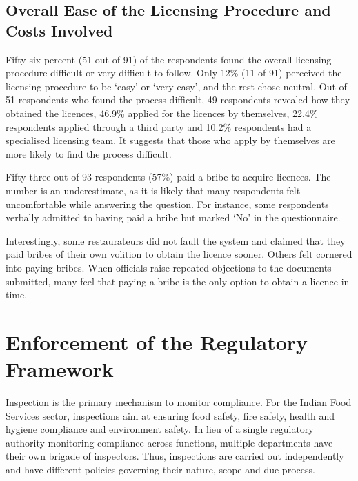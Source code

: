 \documentclass[a4paper, 12pt]{article}
\begin{document}
		
		
		\subsection{Overall Ease of the Licensing Procedure and Costs Involved}
		Fifty-six percent (51 out of 91) of the respondents found the overall licensing procedure difficult or very difficult to follow. Only 12\% (11 of 91) perceived the licensing procedure to be ‘easy’ or ‘very easy’, and the rest chose neutral. Out of 51 respondents who found the process difficult, 49 respondents revealed how they obtained the licences, 46.9\% applied for the licences by themselves, 22.4\% respondents applied through a third party and 10.2\% respondents had a specialised licensing team. It suggests that those who apply by themselves are more likely to find the process difficult.
		
		Fifty-three out of 93 respondents (57\%) paid a bribe to acquire licences. The number is an underestimate, as it is likely that many respondents felt uncomfortable while answering the question. For instance, some respondents verbally admitted to having paid a bribe but marked ‘No’ in the questionnaire.
		
		Interestingly, some restaurateurs did not fault the system and claimed that they paid bribes of their own volition to obtain the licence sooner. Others felt cornered into paying bribes. When officials raise repeated objections to the documents submitted, many feel that paying a bribe is the only option to obtain a licence in time.
		
		

	
		\section{Enforcement of the Regulatory Framework}
		\label{sec:2}
		
		Inspection is the primary mechanism to monitor compliance. For the Indian Food Services sector, inspections aim at ensuring food safety, fire safety, health and hygiene compliance and environment safety. In lieu of a single regulatory authority monitoring compliance across functions, multiple departments have their own brigade of inspectors. Thus, inspections are carried out independently and have different policies governing their nature, scope and due process.
		
\end{document}
